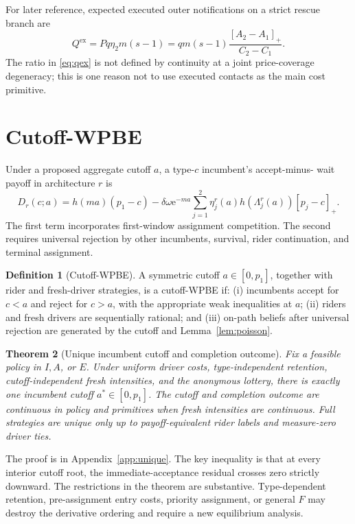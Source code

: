\documentclass[11pt]{article}
\newtheorem{theorem}{Theorem}
\theoremstyle{definition}
\newtheorem{definition}[theorem]{Definition}
\theoremstyle{remark}
\newcommand{\e}{\mathrm e}
\newcommand{\ex}{\mathrm{ex}}
\begin{document}
For later reference, expected executed outer notifications on a strict rescue
branch are
\begin{equation}
Q^{\ex}=Pq\eta_2m(s-1)
=qm(s-1)\frac{[A_2-A_1]_+}{C_2-C_1}.
\label{eq:qex}
\end{equation}
The ratio in \eqref{eq:qex} is not defined by continuity at a joint
price-coverage degeneracy; this is one reason not to use executed contacts as
the main cost primitive.

\section{Cutoff-WPBE}

Under a proposed aggregate cutoff $a$, a type-$c$ incumbent's accept-minus-
wait payoff in architecture $r$ is
\begin{equation}
D_r(c;a)=h(ma)(p_1-c)
-\delta\omega\e^{-ma}
\sum_{j=1}^2\eta_j^r(a)h(\Lambda_j^r(a))[p_j-c]_+.
\label{eq:D}
\end{equation}
The first term incorporates first-window assignment competition.  The second
requires universal rejection by other incumbents, survival, rider
continuation, and terminal assignment.

\begin{definition}[Cutoff-WPBE]
A symmetric cutoff $a\in[0,p_1]$, together with rider and fresh-driver
strategies, is a cutoff-WPBE if: (i) incumbents accept for $c<a$ and reject for
$c>a$, with the appropriate weak inequalities at $a$; (ii) riders and fresh
drivers are sequentially rational; and (iii) on-path beliefs after universal
rejection are generated by the cutoff and Lemma~\ref{lem:poisson}.
\end{definition}

\begin{theorem}[Unique incumbent cutoff and completion outcome]
\label{thm:unique}
Fix a feasible policy in $I,A$, or $E$.  Under uniform driver costs,
type-independent retention, cutoff-independent fresh intensities, and the
anonymous lottery, there is exactly one incumbent cutoff
$a^*\in[0,p_1]$.  The cutoff and completion outcome are continuous in policy
and primitives when fresh intensities are continuous.  Full strategies are
unique only up to payoff-equivalent rider labels and measure-zero driver ties.
\end{theorem}

The proof is in Appendix~\ref{app:unique}.  The key inequality is that at every
interior cutoff root, the immediate-acceptance residual crosses zero strictly
downward.  The restrictions in the theorem are substantive.  Type-dependent
retention, pre-assignment entry costs, priority assignment, or general $F$
may destroy the derivative ordering and require a new equilibrium analysis.
\end{document}
